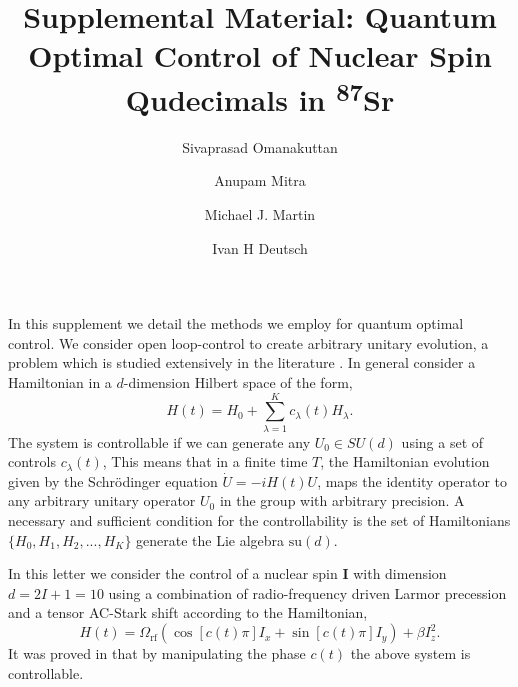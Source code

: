\documentclass[aps,prl,onecolumn,reprint,superscriptaddress]{revtex4}
\begin{document}
\title{Supplemental Material: Quantum Optimal Control of Nuclear Spin Qudecimals in \textsuperscript{87}Sr}
\author{Sivaprasad Omanakuttan}
\author{Anupam Mitra}
\author{Michael J. Martin }
\author{Ivan H Deutsch}
\maketitle


In this supplement we detail the methods we employ for quantum optimal control.  We consider open loop-control to create arbitrary unitary evolution, a problem which is studied extensively in the literature \cite{jurdjevic1972control,brockett1973lie,schirmer2002degrees, goerz2015optimizing, glaser2015training}. In general consider a Hamiltonian in a $d$-dimension Hilbert space of the form, 
\begin{equation}
H(t)=H_0+\sum_{\lambda=1}^{K}c_\lambda(t)H_{\lambda}.
\label{eqn: control Hamiltonian}
\end{equation}
 The system is controllable if we can generate any $U_0\in SU(d)$ using a set of controls $c_\lambda(t)$,  This means that in a finite time $T$, the Hamiltonian evolution given by the Schr{\"o}dinger equation $\dot{U}=-iH(t)U$, maps the identity operator to any arbitrary unitary operator $U_0$ in the group with arbitrary precision. A necessary and sufficient condition for the controllability is the set of Hamiltonians $\{H_0,H_1,H_2,..., H_K\}$ generate the Lie algebra $\mathrm{su}\left(d\right)$.  
 
 In this letter we consider the control of a nuclear spin $\mathbf{I}$ with dimension $d=2I+1=10$ using a combination of radio-frequency driven Larmor precession and a tensor AC-Stark shift according to the Hamiltonian,
\begin{equation}
H(t)=\Omega_{\mathrm{rf}} \left( \cos[c(t) \pi]I_x+\sin[c(t) \pi] I_y\right)+\beta I_z^2.
\label{eq:Control_Hamiltonian}
\end{equation}
It was proved in \cite{Merkel2008} that by manipulating the phase $c(t)$ the above system is controllable.
\end{document}
